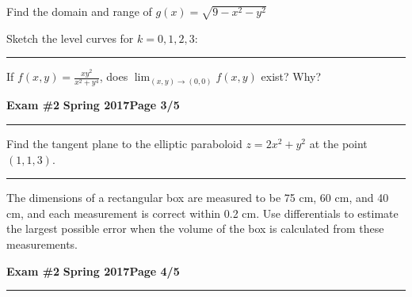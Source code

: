 \documentclass[12pt]{article}
\theoremstyle{definition}
\begin{document}
\bigskip
{\problem[15 pts] Find the domain and range of
$g(x)=\sqrt{9-x^2-y^2}$}
\vspace{2.5cm}
\begin{flushright}
\end{flushright}
Sketch the level curves for $k=0,1,2,3$:
\vspace{8cm}
\hrule
{\problem[15 pts] If $f(x,y)=\displaystyle{\frac{xy^2}{x^2+y^4}}$, does
$\displaystyle{\lim_{(x,y)\to(0,0)} f(x,y)}$ exist?  Why?
\newpage

\hfill{\large\bf Exam \#2}\hfill{\large\bf
  Spring 2017}\hfill{\large\bf Page 3/5}\hrule

\bigskip
{\problem[15 pts] Find the tangent plane to the elliptic paraboloid
$z=2x^2+y^2$ at the point $(1,1,3)$.}
\vspace{9.5cm}
\begin{flushright}
\end{flushright}
\hrule
{\problem[10 pts] The dimensions of a rectangular box are measured
to be 75 cm, 60 cm, and 40 cm, and each measurement is correct within
0.2 cm.  Use differentials to estimate the largest possible error when
the volume of the box is calculated from these measurements.}
\vspace{7.5cm}
\begin{flushright}
\end{flushright}
\newpage

\hfill{\large\bf Exam \#2}\hfill{\large\bf
  Spring 2017}\hfill{\large\bf Page 4/5}\hrule

}
\end{document}
